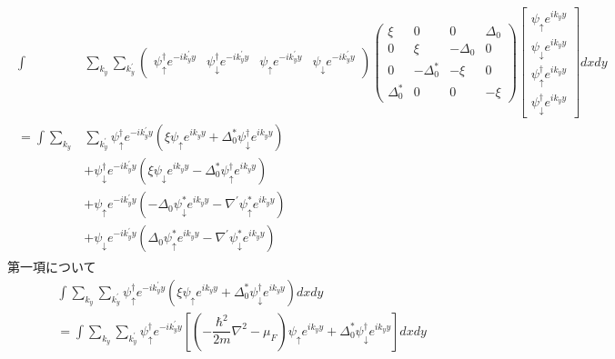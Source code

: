 \documentclass{jarticle}
\begin{document}
  \begin{align}
  \begin{split}
  	\int&\displaystyle\sum_{k_y}\sum_{k_y^{'}}\begin{pmatrix}
  	\psi_{\uparrow}^{\dagger}e^{-ik_y^{'}y} & \psi_{\downarrow}^{\dagger}e^{-ik_y^{'}y} & \psi_{\uparrow}e^{-ik_y^{'}y} & \psi_{\downarrow}e^{-ik_y^{'}y}
  	\end{pmatrix}
  	 \begin{pmatrix}
  	\xi & 0 & 0 & \Delta_0 \\ 
  	0 & \xi & -\Delta_0 & 0 \\ 
  	0 & -\Delta^{*}_0 & -\xi & 0 \\ 
  	\Delta^{*}_0 & 0 & 0 & -\xi
  	\end{pmatrix}
  	\displaystyle\begin{bmatrix}
  	\psi_{\uparrow}e^{ik_yy} \\
  	\psi_{\downarrow}e^{ik_yy} \\
  	\psi_{\uparrow}^{\dagger} e^{ik_yy}\\
  	\psi_{\downarrow}^{\dagger}e^{ik_yy}
  	\end{bmatrix}dxdy
  	\\=\int\displaystyle\sum_{k_y}&\sum_{k_y^{'}}\psi_{\uparrow}^{\dagger}e^{-ik_y^{'}y}(\xi\psi_{\uparrow}e^{ik_yy}+\Delta^{*}_0\psi_{\downarrow}^{\dagger}e^{ik_yy})\\&
  	                                                                 +\psi_{\downarrow}^{\dagger}e^{-ik_y^{'}y}(\xi\psi_{\downarrow}e^{ik_yy}-\Delta^{*}_0\psi_{\uparrow}^{\dagger}e^{ik_yy})\\&
  	                                                                +\psi_{\uparrow}e^{-ik_y^{'}y}(-\Delta_0\psi_{\downarrow}^{*}e^{ik_yy}-\nabla^{'}\psi_{\uparrow}^{*}e^{ik_yy})\\&
  	                                                                 +\psi_{\downarrow}e^{-ik_y^{'}y}(\Delta_0\psi_{\uparrow}^{*}e^{ik_yy}-\nabla^{'}\psi_{\downarrow}^{*}e^{ik_yy})
  \end{split}	                                                          
\end{align}
第一項について
\begin{align}
&\int\displaystyle\sum_{k_y}\sum_{k_y^{'}}\psi_{\uparrow}^{\dagger}e^{-ik_y^{'}y}(\xi\psi_{\uparrow}e^{ik_yy}+\Delta^{*}_0\psi_{\downarrow}^{\dagger}e^{ik_yy})dxdy\\
&=\int\displaystyle\sum_{k_y}\sum_{k_y^{'}}\psi_{\uparrow}^{\dagger}e^{-ik_y^{'}y}[(-\dfrac{\hbar^2}{2m}\nabla^2-\mu_F)\psi_{\uparrow}e^{ik_yy}+\Delta^{*}_0\psi_{\downarrow}^{\dagger}e^{ik_yy}]dxdy\\
\end{align}
\end{document}
